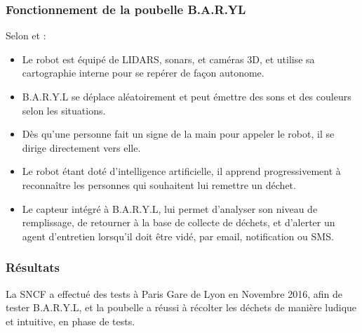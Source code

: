 \documentclass[a4paper,12pt]{report}
\begin{document}
\subsubsection*{Fonctionnement de la poubelle B.A.R.YL}
Selon \cite{ref15} et \cite{ref16} :
\begin{itemize}
\item  Le robot est équipé de LIDARS, sonars, et caméras 3D, et utilise sa cartographie interne pour se repérer de façon autonome.
\item B.A.R.Y.L se déplace aléatoirement et peut émettre des sons et des couleurs selon les situations. 
\item Dès qu'une personne fait un signe de la main pour appeler le robot, il se dirige directement vers elle.
\item Le robot étant doté d'intelligence artificielle, il apprend progressivement à reconnaître les personnes qui souhaitent lui remettre un déchet.
\item Le capteur intégré à B.A.R.Y.L, lui permet d'analyser son niveau de remplissage, de retourner à la base de collecte de déchets, et d'alerter un agent d'entretien lorsqu'il doit être vidé, par email, notification ou SMS.
\end{itemize}
\subsubsection*{Résultats}
La SNCF a effectué des tests à Paris Gare de Lyon en Novembre 2016, afin de tester B.A.R.Y.L, et la poubelle a réussi à récolter les déchets de manière ludique et intuitive, en phase de tests.
\end{document}
